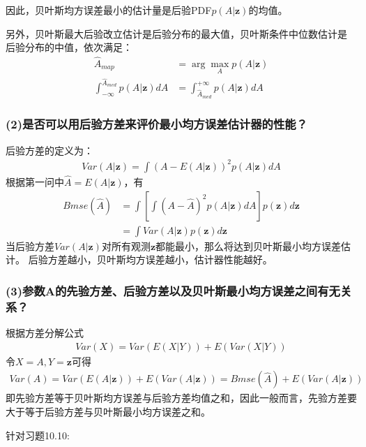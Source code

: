 \documentclass[fontset=windows]{article}
\numberwithin{figure}{section}
\begin{document}
因此，贝叶斯均方误差最小的估计量是后验PDF\(p(A|\mathbf{z})\)的均值。

另外，贝叶斯最大后验改立估计是后验分布的最大值，贝叶斯条件中位数估计是
后验分布的中值，依次满足：
\begin{align*}
	\hat{A}_{map} & =\arg \underset{A}{\max} p(A|\mathbf{z})          \\
	\int_{-\infty}^{\hat{A}_{med}} p(A|\mathbf{z})dA
	              & =\int^{+\infty}_{\hat{A}_{med}} p(A|\mathbf{z})dA
\end{align*}

\subsubsection*{(2)是否可以用后验方差来评价最小均方误差估计器的性能？}
后验方差的定义为：
\begin{align*}
	Var(A|\mathbf{z})=\int (A-E(A|\mathbf{z}))^2 p(A|\mathbf{z})dA
\end{align*}
根据第一问中\(\hat{A}=E(A|\mathbf{z})\)，有
\begin{align*}
	Bmse(\hat{A})
	 & =\int \left[\int (A-\hat{A})^2 p(A|\mathbf{z})dA\right]p(\mathbf{z})d\mathbf{z} \\
	 & =\int Var(A|\mathbf{z})p(\mathbf{z})d\mathbf{z}
\end{align*}
当后验方差\(Var(A|\mathbf{z})\)对所有观测\(\mathbf{z}\)都能最小，那么将达到贝叶斯最小均方误差估计。
后验方差越小，贝叶斯均方误差越小，估计器性能越好。

\subsubsection*{(3)参数A的先验方差、后验方差以及贝叶斯最小均方误差之间有无关系？}
根据方差分解公式
\begin{align*}
	Var(X)=Var(E(X|Y))+E(Var(X|Y))
\end{align*}
令\(X=A,Y=\mathbf{z}\)可得
\begin{align*}
	Var(A)=Var(E(A|\mathbf{z}))+E(Var(A|\mathbf{z}))=Bmse(\hat{A})+E(Var(A|\mathbf{z}))
\end{align*}
即先验方差等于贝叶斯均方误差与后验方差均值之和，因此一般而言，先验方差要大于等于后验方差与贝叶斯最小均方误差之和。

针对习题10.10:
\end{document}
